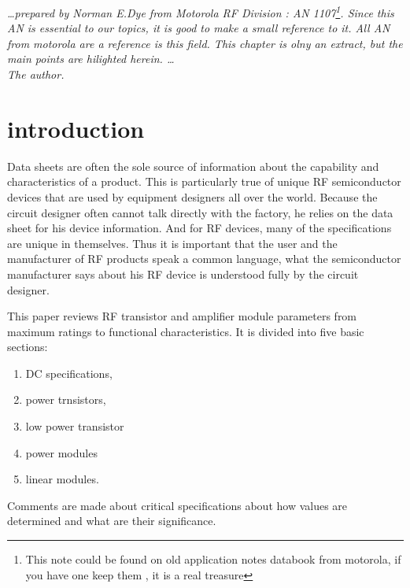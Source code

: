 %
%
%
%

\textit{\ldots prepared by Norman E.Dye from Motorola RF Division : AN 1107\footnote{This note could be found on old application notes databook from motorola, if you have one keep them , it is a real treasure}. Since this AN is essential to our topics, it is good to make a small reference to it. All AN from motorola are a reference is this field. This chapter is olny an extract, but the main points are hilighted herein.  \ldots \\ The author.}

\section{introduction}
Data sheets are often the sole source of information about the capability and characteristics of a product. This is particularly true of unique RF semiconductor devices that are used by equipment designers all over the world. Because the circuit designer often cannot talk directly with the factory, he relies on the data sheet for his device information. And for RF devices, many of the specifications are unique in themselves. Thus it is important that the user and the manufacturer of RF products speak a common language, what the semiconductor manufacturer says about his RF device is understood fully by the circuit designer.

\bigskip 

This paper reviews RF transistor and amplifier module parameters from maximum ratings to functional characteristics. It is divided into five basic sections:

\begin{enumerate}
\item DC specifications,
\item power trnsistors,
\item low power transistor
\item power modules
\item linear modules.
\end{enumerate} 

Comments are made about critical specifications about how values are determined and what are their significance. 


